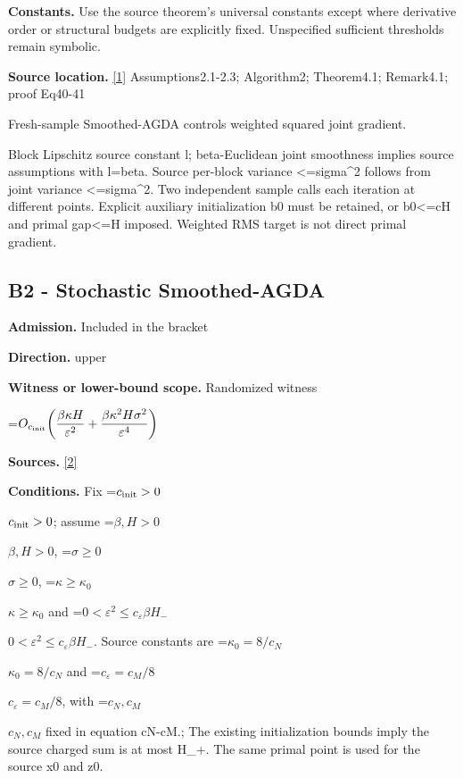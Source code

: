 \documentclass[10pt,a4paper]{article}
\newcommand{\AtlasMath}[1]{\par\begingroup\centering\setbox0=\hbox{$\displaystyle #1$}\ifdim\wd0>1.4\linewidth\typeout{ATLAS WIDE FORMULA: \the\wd0}\fi\ifdim\wd0>\linewidth\resizebox{\linewidth}{!}{\box0}\else\box0\fi\par\endgroup}
\newcommand{\AtlasInlineMath}[1]{\begingroup\setbox0=\hbox{$#1$}\ifdim\wd0>.4\linewidth\endgroup\AtlasMath{#1}\else\endgroup$#1$\fi}
\begin{document}
\textbf{Constants.} Use the source theorem’s universal constants except where derivative order or structural budgets are explicitly fixed. Unspecified sufficient thresholds remain symbolic.



\textbf{Source location.} \href{https://proceedings.mlr.press/v151/yang22b/yang22b.pdf}{[1]} Assumptions2.1-2.3; Algorithm2; Theorem4.1; Remark4.1; proof Eq40-41



Fresh-sample Smoothed-AGDA controls weighted squared joint gradient.



Block Lipschitz source constant l; beta-Euclidean joint smoothness implies source assumptions with l=beta. Source per-block variance <=sigma\textasciicircum{}2 follows from joint variance <=sigma\textasciicircum{}2. Two independent sample calls each iteration at different points. Explicit auxiliary initialization b0 must be retained, or b0<=cH and primal gap<=H imposed. Weighted RMS target is not direct primal gradient.



\subsection{B2 - Stochastic Smoothed-AGDA}


\textbf{Admission.} Included in the bracket



\textbf{Direction.} upper



\textbf{Witness or lower-bound scope.} Randomized witness



\AtlasMath{O_{c_{\rm init}}\!\left(\frac{\beta\kappa H}{\varepsilon^2}+\frac{\beta\kappa^2H\sigma^2}{\varepsilon^4}\right)}


\textbf{Sources.} \href{https://github.com/WU-Wendao/Colombo/blob/main/colombo_sensorium/Complexity_altas/data/sources/colombo/N07/manuscript.pdf}{[2]}



\textbf{Conditions.} Fix \AtlasInlineMath{c_{\rm init}>0}; assume \AtlasInlineMath{\beta,H>0}, \AtlasInlineMath{\sigma\ge0}, \AtlasInlineMath{\kappa\ge\kappa_0} and \AtlasInlineMath{0<\varepsilon^2\le c_\varepsilon\beta H_-}. Source constants are \AtlasInlineMath{\kappa_0=8/c_N} and \AtlasInlineMath{c_\varepsilon=c_M/8}, with \AtlasInlineMath{c_N,c_M} fixed in equation cN-cM.; The existing initialization bounds imply the source charged sum is at most H\_+. The same primal point is used for the source x0 and z0.
\end{document}
